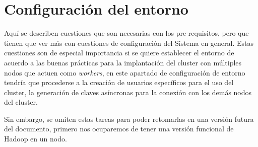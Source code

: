 \section{Configuración del entorno}
\label{sec:configuracion_del_entorno}

Aquí se describen cuestiones que son necesarias con los pre-requisitos, pero
que tienen que ver más con cuestiones de configuración del Sistema en general.
Estas cuestiones son de especial importancia si se quiere establecer el entorno
de acuerdo a las buenas prácticas para la implantación del \gls{cluster} con
múltiples nodos que actuen como {\it workers}, en este apartado de
configuración de entorno tendría que procederse a la creación de usuarios específicos
para el uso del cluster, la generación de claves asíncronas para la conexión con los
demás nodos del cluster. 

Sin embargo, se omiten estas tareas para poder retomarlas en una versión futura del
documento, primero nos ocuparemos de tener una versión funcional de Hadoop en
un nodo.






